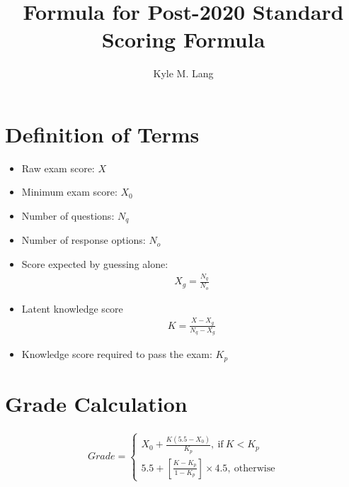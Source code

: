 \documentclass[12pt]{article}
\title{Formula for Post-2020 Standard Scoring Formula}
\author{Kyle M. Lang}
\begin{document}
\maketitle

\section{Definition of Terms}

\begin{itemize}
\item Raw exam score: $X$
\item Minimum exam score: $X_0$
\item Number of questions: $N_q$
\item Number of response options: $N_o$
\item Score expected by guessing alone:\begin{align*}
    X_g = \frac{N_q}{N_o}
  \end{align*}
\item Latent knowledge score
  \begin{align*}
    K = \frac{X - X_g}{N_q - X_g}
  \end{align*}
\item Knowledge score required to pass the exam: $K_p$
\end{itemize}

\section{Grade Calculation}

\begin{align*}
  \textit{Grade} =
  \begin{cases}
    X_0 + \frac{K (5.5 - X_0)}{K_p},~\text{if}~K < K_p\\
    5.5 + \left[\frac{K - K_p}{1 - K_p}\right] \times 4.5,~\text{otherwise}
  \end{cases}
\end{align*}
\end{document}
